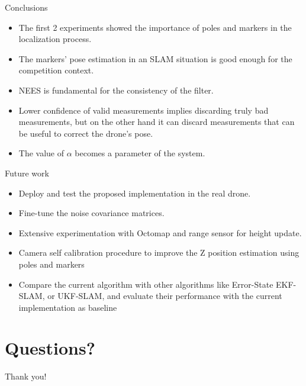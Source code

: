 \documentclass[serif,aspectratio=169]{beamer}
\begin{document}
    \begin{frame}{Conclusions}
        \begin{itemize}
            \item{The first 2 experiments showed the importance of poles and markers in the localization process.}
            \item{The markers' pose estimation in an SLAM situation is good enough for the competition context.}
            \item{NEES is fundamental for the consistency of the filter.}
            \item{Lower confidence of valid measurements implies discarding truly bad measurements, but on the other hand it can discard measurements that can be useful to correct the drone's pose.}
            \item{The value of $\alpha$ becomes a parameter of the system.}
        \end{itemize}
    \end{frame}

    \begin{frame}{Future work}
        \begin{itemize}
            \item{Deploy and test the proposed implementation in the real drone.}
            \item{Fine-tune the noise covariance matrices.}
            \item{Extensive experimentation with Octomap and range sensor for height update.}
            \item{Camera self calibration procedure to improve the Z position estimation using poles and markers}
            \item{Compare the current algorithm with other algorithms like Error-State EKF-SLAM, or UKF-SLAM, and evaluate their performance with the current implementation as baseline}
        \end{itemize}
    \end{frame}

    \section*{Questions?}
    \begin{frame}[plain]{}
        \Huge{Thank you!}
        \sectionpage
    \end{frame}
\end{document}
